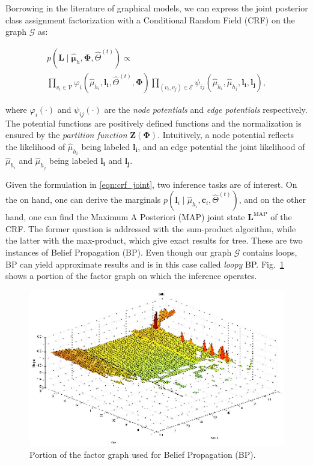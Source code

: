 Borrowing in the literature of graphical models, we can express the joint
posterior class assignment factorization with a Conditional Random Field (CRF)
on the graph $\mathcal{G}$ as:

\begin{eqnarray}
\label{eqn:crf_joint}
p(\mathbf{L}\mid\hat{\boldsymbol\mu}_h,\boldsymbol{\Phi},\hat{\Theta}^{(t)})
\propto
\phantom{aaaaaaaaaaaaaaaaaaaaaaaaaaaa}\\ \nonumber
\prod_{v_i\in\mathcal{V}}
\varphi_i(\hat{\mu}_{h_i},\mathbf{l_i},\hat{\Theta}^{(t)},\boldsymbol{\Phi})
\prod_{(v_i,v_j)\in\mathcal{E}}\psi_{ij}(\hat{\mu}_{h_i},\hat{\mu}_{h_j},
\mathbf{l_i},\mathbf{l_j}),
\end{eqnarray}

where $\varphi_i(\cdot)$ and $\psi_{ij}(\cdot)$ are the \emph{node potentials}
and \emph{edge potentials} respectively. The potential functions are positively
defined functions and the normalization is ensured by the
\emph{partition function} $\mathbf{Z}(\boldsymbol{\Phi})$. Intuitively, a node 
potential reflects the likelihood of $\hat{\mu}_{h_i}$ being labeled
$\mathbf{l_i}$, and an edge potential the joint likelihood of $\hat{\mu}_{h_i}$
and $\hat{\mu}_{h_j}$ being labeled $\mathbf{l_i}$ and $\mathbf{l_j}$.

Given the formulation in \eqref{eqn:crf_joint}, two inference tasks are of
interest. On the on hand, one can derive the marginals
$p(\mathbf{l}_i\mid\hat{\mu}_{h_i},\mathbf{c}_i,\hat{\Theta}^{(t)})$, and on the
other hand, one can find the Maximum A Posteriori (MAP) joint state
$\mathbf{L}^\text{MAP}$ of the CRF. The former question is addressed with the
sum-product algorithm, while the latter with the max-product, which give exact
results for tree. These are two instances of Belief Propagation (BP). Even
though our graph $\mathcal{G}$ contains loops, BP can yield approximate results
and is in this case called \emph{loopy} BP. Fig.~\ref{fig:fg} shows a portion
of the factor graph on which the inference operates.

\begin{figure}[t]
\centering
\includegraphics[width=\columnwidth]{fig/dem.eps}
\caption{Portion of the factor graph used for Belief Propagation (BP).}
\label{fig:fg}
\end{figure}

